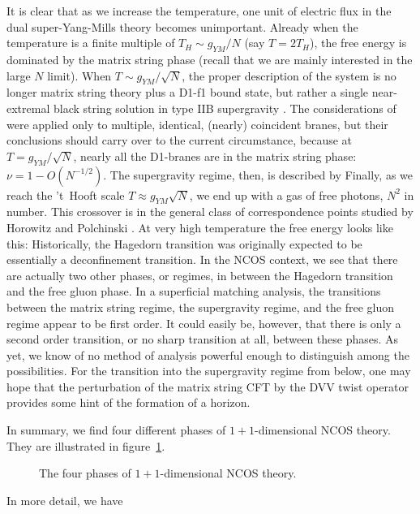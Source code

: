 It is clear that as we increase the temperature, one unit of electric
flux in the dual super-Yang-Mills theory becomes unimportant.  Already
when the temperature is a finite multiple of $T_H \sim g_{YM}/N$ (say
$T = 2 T_H$), the free energy is dominated by the matrix string phase
(recall that we are mainly interested in the large $N$ limit).  When
$T \sim g_{YM}/\sqrt{N}$, the proper description of the system is no
longer matrix string theory plus a D1-f1 bound state, but rather a
single near-extremal black string solution in type IIB supergravity
\cite{KS,IMSY}.  The considerations of \cite{KS,IMSY} were applied
only to multiple, identical, (nearly) coincident branes, but their
conclusions should carry over to the current circumstance, because at
$T = g_{YM}/\sqrt{N}$, nearly all the D1-branes are in the matrix
string phase: $\nu = 1 - O(N^{-1/2})$.  The supergravity regime, then,
is described by \cite{KS,IMSY}
 Finally, as we reach the 't~Hooft scale $T \approx g_{YM} \sqrt{N}$,
we end up with a gas of free photons, $N^2$ in number.  This crossover
is in the general class of correspondence points studied by Horowitz
and Polchinski \cite{hp}.  At very high temperature the free energy
looks like this:
 Historically, the Hagedorn transition was originally expected to be
essentially a deconfinement transition.  In the NCOS context, we see
that there are actually two other phases, or regimes, in between the
Hagedorn transition and the free gluon phase.  In a superficial
matching analysis, the transitions between the matrix string regime,
the supergravity regime, and the free gluon regime appear to be first
order.  It could easily be, however, that there is only a second order
transition, or no sharp transition at all, between these phases.  As
yet, we know of no method of analysis powerful enough to distinguish
among the possibilities.  For the transition into the supergravity
regime from below, one may hope that the perturbation of the matrix
string CFT by the DVV twist operator \cite{DVV} provides some hint of the
formation of a horizon.

In summary, we find four different phases of $1+1$-dimensional
NCOS theory.  They are illustrated in figure~\ref{figA}.
  \begin{figure}[p]
   \centerline{}
   \caption{The four phases of $1+1$-dimensional NCOS theory.}\label{figA}
  \end{figure}
 In more detail, we have

